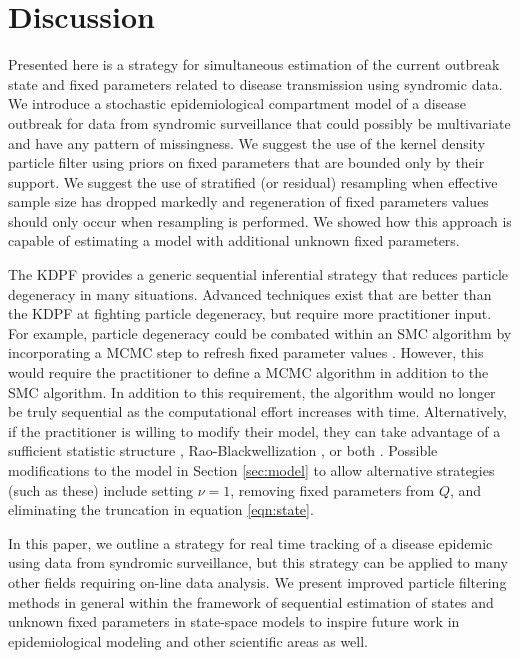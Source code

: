 \documentclass{elsarticle}
\begin{document}
\section{Discussion \label{sec:discussion}}

Presented here is a strategy for simultaneous estimation of the current outbreak state and fixed parameters related to disease transmission using syndromic data. We introduce a stochastic epidemiological compartment model of a disease outbreak for data from syndromic surveillance that could possibly be multivariate and have any pattern of missingness. We suggest the use of the kernel density particle filter \citep{Liu:West:comb:2001} using priors on fixed parameters that are bounded only by their support. We suggest the use of stratified (or residual) resampling when effective sample size has dropped markedly and regeneration of fixed parameters values should only occur when resampling is performed. We showed how this approach is capable of estimating a model with additional unknown fixed parameters.

The KDPF provides a generic sequential inferential strategy that reduces particle degeneracy in many situations. Advanced techniques exist that are better than the KDPF at fighting particle degeneracy, but require more practitioner input. For example, particle degeneracy could be combated within an SMC algorithm by incorporating a MCMC step to refresh fixed parameter values \citep{Gilk:Berz:foll:2001,Stor:part:2002}. However, this would require the practitioner to define a MCMC algorithm in addition to the SMC algorithm. In addition to this requirement, the algorithm would no longer be truly sequential as the computational effort increases with time. Alternatively, if the practitioner is willing to modify their model, they can take advantage of a sufficient statistic structure \citep{Fear:mark:2002}, Rao-Blackwellization \citep{Douc:Gods:Andr:on:2000}, or both \citep{carvalho2010particle}. Possible modifications to the model in Section \ref{sec:model} to allow alternative strategies (such as these) include setting $\nu=1$, removing fixed parameters from $Q$, and eliminating the truncation in equation \eqref{eqn:state}.

In this paper, we outline a strategy for real time tracking of a disease epidemic using data from syndromic surveillance, but this strategy can be applied to many other fields requiring on-line data analysis. We present improved particle filtering methods in general within the framework of sequential estimation of states and unknown fixed parameters in state-space models to inspire future work in epidemiological modeling and other scientific areas as well.

\clearpage



\end{document}
